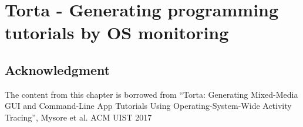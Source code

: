 \chapter{Torta - Generating programming tutorials by OS monitoring}







\section{Acknowledgment}
The content from this chapter is borrowed from ``Torta: Generating Mixed-Media GUI and Command-Line App Tutorials Using Operating-System-Wide Activity Tracing'', Mysore et al. ACM UIST 2017~\cite{MysoreUIST2017}
